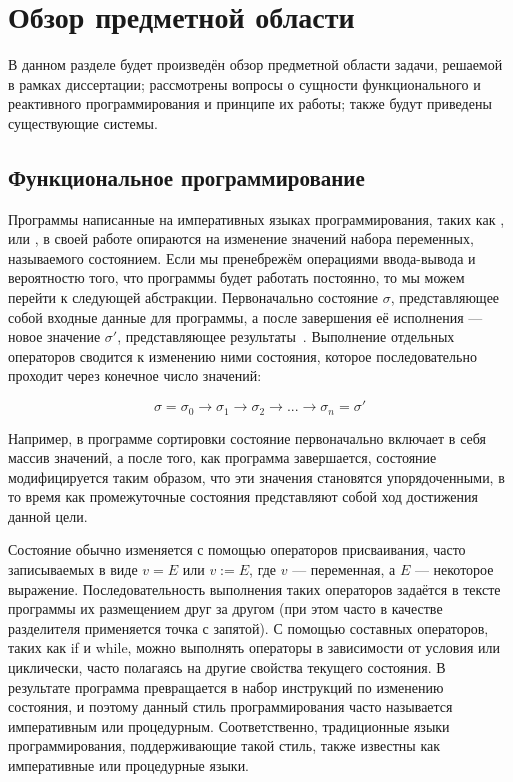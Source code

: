 \chapter{Обзор предметной области}
\label{sec:domain}

В данном разделе будет произведён обзор предметной области задачи, решаемой в рамках диссертации; рассмотрены вопросы о сущности функционального и реактивного программирования и принципе их работы; также будут приведены существующие системы.

\section{Функциональное программирование}
\label{sub:domain:functional_programming}

Программы написанные на императивных языках программирования, таких как \csharp{}, \java{} или \cpp{}, в своей работе опираются на изменение значений набора переменных, называемого состоянием. Если мы пренебрежём операциями ввода-вывода и вероятностю того, что программы будет работать постоянно, то мы можем перейти к следующей абстракции. Первоначально состояние $\sigma$, представляющее собой входные данные для программы, а после завершения её исполнения --- новое значение $\sigma'$, представляющее результаты~\cite{intro2fp}. Выполнение отдельных операторов сводится к изменению ними состояния, которое последовательно проходит через конечное число значений:

\begin{equation}
  \label{eq:domain:states_transition}
  \sigma = \sigma_{0} \rightarrow \sigma_{1} \rightarrow \sigma_{2} \rightarrow ... \rightarrow \sigma_{n} = \sigma'
\end{equation}

Например, в программе сортировки состояние первоначально включает в себя массив значений, а после того, как программа завершается, состояние модифицируется таким образом, что эти значения становятся упорядоченными, в то время как промежуточные состояния представляют собой ход достижения данной цели.

Состояние обычно изменяется с помощью операторов присваивания, часто записываемых в виде $v = E$ или $v := E$, где $v$ --- переменная, а $E$ --- некоторое выражение. Последовательность выполнения таких операторов задаётся в тексте программы их размещением друг за другом (при этом часто в качестве разделителя применяется точка с запятой). С помощью составных операторов, таких как if и while, можно выполнять операторы в зависимости от условия или циклически, часто полагаясь на другие свойства текущего состояния. В результате программа превращается в набор инструкций по изменению состояния, и поэтому данный стиль программирования часто называется императивным или процедурным. Соответственно, традиционные языки программирования, поддерживающие такой стиль, также известны как императивные или процедурные языки.

